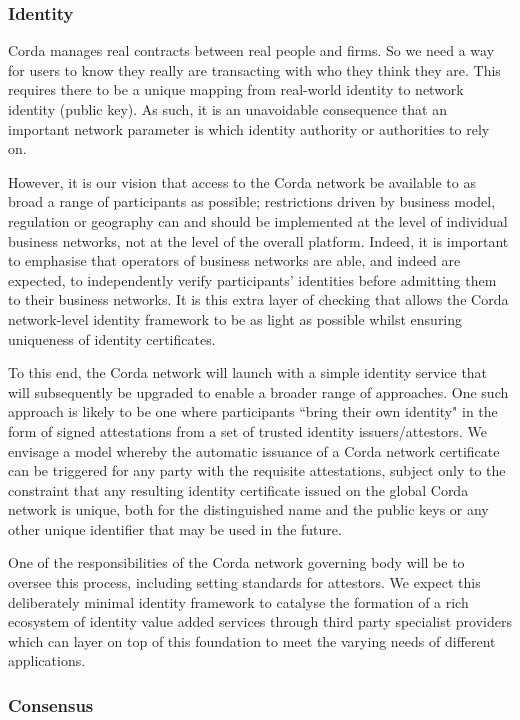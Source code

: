 \documentclass{article}
\begin{document}
\subsubsection{Identity}

Corda manages real contracts between real people and firms. So we need a way for users to know they really are transacting with who they think they are. This requires there to be a unique mapping from real-world identity to network identity (public key). As such, it is an unavoidable consequence that an important network parameter is which identity authority or authorities to rely on.

However, it is our vision that access to the Corda network be available to as broad a range of participants as possible; restrictions driven by business model, regulation or geography can and should be implemented at the level of individual business networks, not at the level of the overall platform. Indeed, it is important to emphasise that operators of business networks are able, and indeed are expected, to independently verify participants' identities before admitting them to their business networks. It is this extra layer of checking that allows the Corda network-level identity framework to be as light as possible whilst ensuring uniqueness of identity certificates.

To this end, the Corda network will launch with a simple identity service that will subsequently be upgraded to enable a broader range of approaches. One such approach is likely to be one where participants ``bring their own identity" in the form of signed attestations from a set of trusted identity issuers/attestors. We envisage a model whereby the automatic issuance of a Corda network certificate can be triggered for any party with the requisite attestations, subject only to the constraint that any resulting identity certificate issued on the global Corda network is unique, both for the distinguished name and the public keys or any other unique identifier that may be used in the future.

One of the responsibilities of the Corda network governing body will be to oversee this process, including setting standards for attestors. We expect this deliberately minimal identity framework to catalyse the formation of a rich ecosystem of identity value added services through third party specialist providers which can layer on top of this foundation to meet the varying needs of different applications.

\subsubsection{Consensus}
\end{document}
